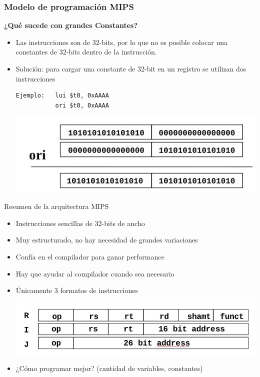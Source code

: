 \documentclass[aspectratio=169,compress]{beamer}
\begin{document}
\begin{footnotesize}
\begin{frame}[fragile]
\frametitle{Modelo de programación MIPS}
\begin{center}\textbf{¿Qué sucede con grandes Constantes?}\end{center}

\begin{itemize}
\item Las instrucciones son de 32-bits, por lo que no es posible colocar una constantes de 32-bits dentro de la instrucción.
\item Solución: para cargar una constante de 32-bit en un registro se utilizan dos instrucciones
\begin{verbatim}
Ejemplo:   lui $t0, 0xAAAA
           ori $t0, 0xAAAA
\end{verbatim}
\includegraphics[scale=0.4]{images/ori.jpg}
\end{itemize}
\end{frame}















\begin{frame}[fragile]{Resumen de la arquitectura MIPS}
\begin{itemize}
\item Instrucciones sencillas de 32-bits de ancho
\item Muy estructurado, no hay necesidad de grandes variaciones
\item Confía en el compilador para ganar performance
\item Hay que ayudar al compilador cuando sea necesario
\item Únicamente 3 formatos de instrucciones
	\begin{center}
\includegraphics[scale=0.3]{images/formato2.jpg} 
	\end{center}
\item ¿Cómo programar mejor? (cantidad de variables, constantes)
\end{itemize}
\end{frame}





\end{footnotesize}
\end{document}

